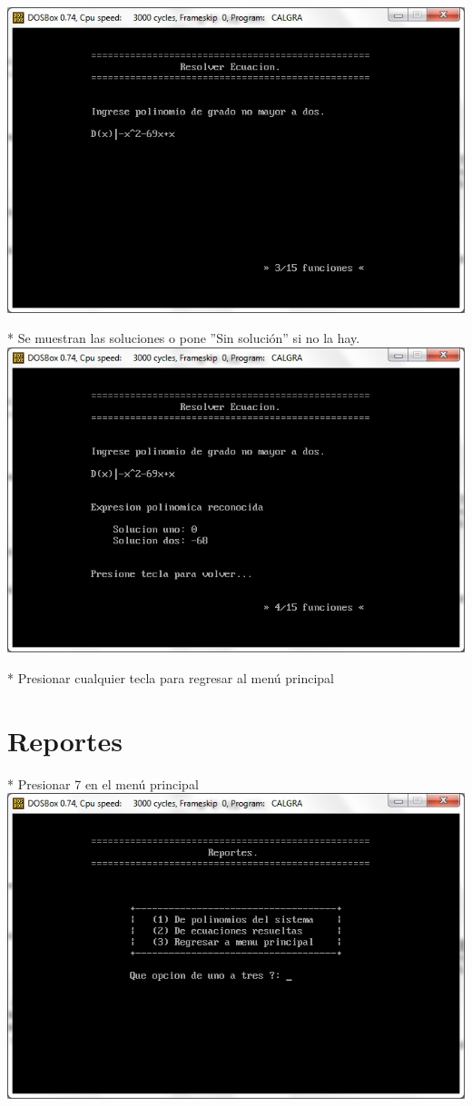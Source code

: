 \documentclass[journal]{../../IEEEtran/IEEEtran}
\begin{document}
\includegraphics[scale=0.42]{img/61.jpg}

* Se muestran las soluciones o pone ''Sin solución'' si no la hay.\\

\includegraphics[scale=0.42]{img/62.jpg}

* Presionar cualquier tecla para regresar al menú principal\\


\section{Reportes}

* Presionar 7 en el menú principal\\

\includegraphics[scale=0.42]{img/71.jpg}
\end{document}
